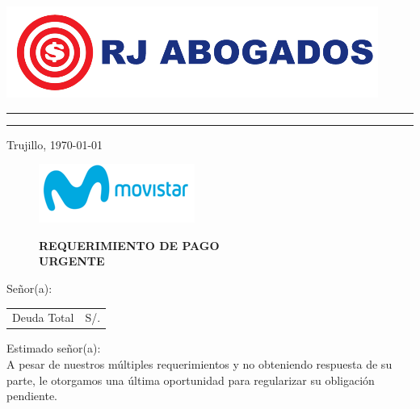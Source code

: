 %
%

\begin{flushleft}
\includegraphics[natwidth=12.170833333cm, natheight=2.989791667cm]{resources/logo.png}
\end{flushleft}
\vspace{-0.8cm}
\textcolor[rgb]{1.00,0.00,0.00}{
\hrule
\hrule
}

\begin{flushright}
    Trujillo, \today
\end{flushright}
\vspace{-0.5cm}

\begin{figure}[h]
\begin{minipage}[b]{5.106458333cm}
\includegraphics[natwidth=5.106458333cm, natheight=1.931458333cm]{resources/business_logo.png}
\end{minipage}
\begin{minipage}[b][1.9314cm][t]{11cm}
\begin{flushright}
{\LARGE \bf REQUERIMIENTO DE PAGO\\URGENTE}
\end{flushright}
\end{minipage}
\end{figure}

\noindent
Señor(a):\\

\begin{flushright}
\bf \large
\begin{tabular}{|p{3.2cm} p{3.2cm}|}
\hline
Deuda Total & S/. %
\hline
\end{tabular}
\end{flushright}

\noindent
Estimado señor(a):\\
A pesar de nuestros múltiples requerimientos y no obteniendo respuesta de su parte, le otorgamos una última oportunidad para regularizar su obligación pendiente.\\

